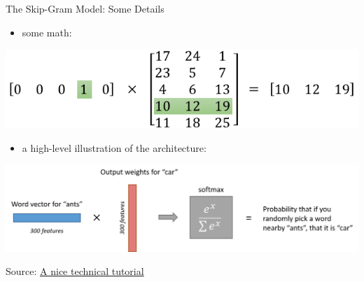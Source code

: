 \documentclass[professionalfonts, xcolor={usenames,svgnames,x11names,table}]{beamer}
\begin{document}
\begin{frame}{The Skip-Gram Model: Some Details}

\begin{itemize}
\item some math:
\end{itemize}

\begin{center}
        \includegraphics[width=0.8\linewidth]{./img/skip_gram_matrix}
\end{center}

\vspace{0.5cm}

\begin{itemize}
\item a high-level illustration of the architecture:
\end{itemize}

\begin{center}
        \includegraphics[width=1\linewidth]{./img/skip_gram2}
\end{center}

\footnotesize{Source: \href{https://israelg99.github.io/2017-03-23-Word2Vec-Explained/}{A nice technical tutorial}}
\end{frame}
\end{document}
